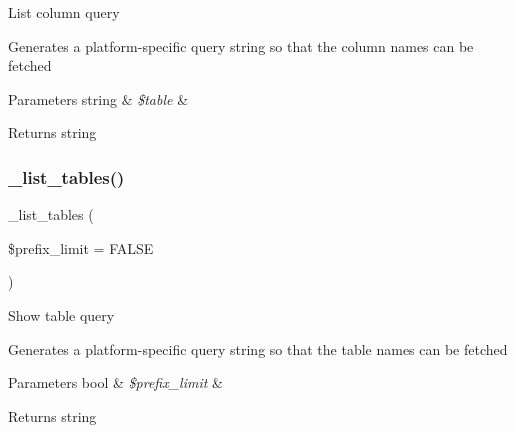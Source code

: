 List column query

Generates a platform-\/specific query string so that the column names can be fetched


\begin{DoxyParams}[1]{Parameters}
string & {\em \$table} & \\
\hline
\end{DoxyParams}
\begin{DoxyReturn}{Returns}
string 
\end{DoxyReturn}
\mbox{\label{class_c_i___d_b__pdo__pgsql__driver_a435c0f3ce54fe7daa178baa8532ebd54}} 
\subsubsection{\texorpdfstring{\+\_\+list\+\_\+tables()}{\_list\_tables()}}
{\footnotesize\ttfamily \+\_\+list\+\_\+tables (\begin{DoxyParamCaption}\item[{}]{\$prefix\+\_\+limit = {\ttfamily FALSE} }\end{DoxyParamCaption})\hspace{0.3cm}{\ttfamily [protected]}}

Show table query

Generates a platform-\/specific query string so that the table names can be fetched


\begin{DoxyParams}[1]{Parameters}
bool & {\em \$prefix\+\_\+limit} & \\
\hline
\end{DoxyParams}
\begin{DoxyReturn}{Returns}
string 
\end{DoxyReturn}
\mbox{\label{class_c_i___d_b__pdo__pgsql__driver_a2540b03a93fa73ae74c10d0e16fc073e}} 
